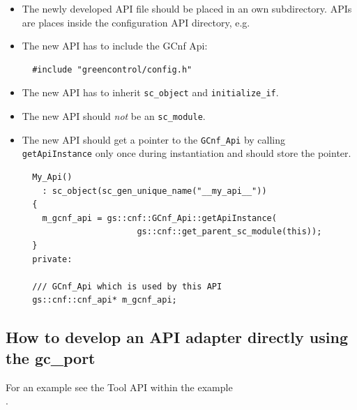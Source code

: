 \begin{itemize}
  \item The newly developed API file should be placed in an own subdirectory. \GreenConfig APIs are places inside the configuration API directory, e.g. 

  \item The new API has to include the GCnf Api:
\begin{lstlisting}
  #include "greencontrol/config.h"
\end{lstlisting}

	\item The new API has to inherit \lstinline|sc_object| and \lstinline|initialize_if|.

	\item The new API should {\em not} be an \lstinline|sc_module|.

	\item The new API should get a pointer to the \lstinline|GCnf_Api| by calling \lstinline|getApiInstance| only once during instantiation and should store the pointer.
\begin{lstlisting}
  My_Api()
    : sc_object(sc_gen_unique_name("__my_api__"))
  {
    m_gcnf_api = gs::cnf::GCnf_Api::getApiInstance(
                       gs::cnf::get_parent_sc_module(this));
  }
  private:

  /// GCnf_Api which is used by this API
  gs::cnf::cnf_api* m_gcnf_api;
\end{lstlisting}

\end{itemize}


\subsection{How to develop an API adapter directly using the gc\_port}
For an example see the Tool API within the \GreenControl example \\
.

